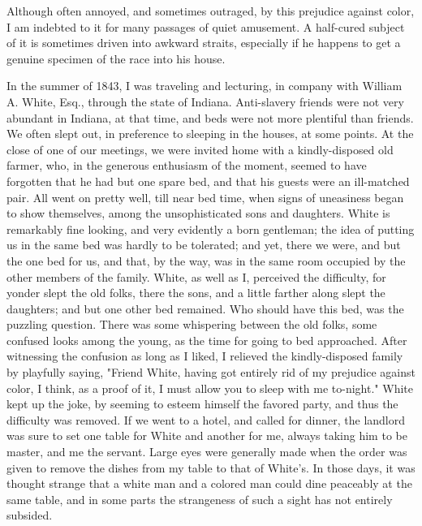 Although often annoyed, and sometimes outraged, by this prejudice
against color, I am indebted to it for many passages of quiet amusement.
A half-cured subject of it is sometimes driven into awkward straits,
{}especially if he happens to get a genuine specimen of the race into
his house.

In the summer of 1843, I was traveling and lecturing, in company with
William A. White, Esq., through the state of Indiana. Anti-slavery
friends were not very abundant in Indiana, at that time, and beds were
not more plentiful than friends. We often slept out, in preference to
sleeping in the houses, at some points. At the close of one of our
meetings, we were invited home with a kindly-disposed old farmer, who,
in the generous enthusiasm of the moment, seemed to have forgotten that
he had but one spare bed, and that his guests were an ill-matched pair.
All went on pretty well, till near bed time, when signs of uneasiness
began to show themselves, among the unsophisticated sons and daughters.
White is remarkably fine looking, and very evidently a born gentleman;
the idea of putting us in the same bed was hardly to be tolerated; and
yet, there we were, and but the one bed for us, and that, by the way,
was in the same room occupied by the other members of the family. White,
as well as I, perceived the difficulty, for yonder slept the old folks,
there the sons, and a little farther along slept the daughters; and but
one other bed remained. Who should have this bed, was the puzzling
question. There was some whispering between the old folks, some confused
looks among the young, as the time for going to bed approached. After
witnessing the confusion as long as I liked, I relieved the
kindly-disposed family by playfully saying, "Friend White, having got
entirely rid of my prejudice against color, I think, as a proof of it, I
{}must allow you to sleep with me to-night." White kept up the joke, by
seeming to esteem himself the favored party, and thus the difficulty was
removed. If we went to a hotel, and called for dinner, the landlord was
sure to set one table for White and another for me, always taking him to
be master, and me the servant. Large eyes were generally made when the
order was given to remove the dishes from my table to that of White's.
In those days, it was thought strange that a white man and a colored man
could dine peaceably at the same table, and in some parts the
strangeness of such a sight has not entirely subsided.

